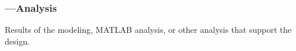 \subsubsection*{ ---Analysis}
Results of the modeling, MATLAB analysis, or other analysis that support the design.